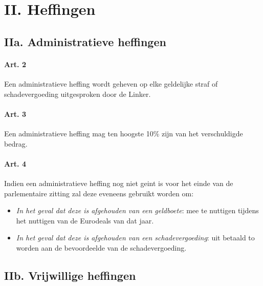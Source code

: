 \hypertarget{ii.-heffingen}{%
\section{II. Heffingen}\label{ii.-heffingen}}

\hypertarget{iia.-administratieve-heffingen}{%
\subsection{IIa. Administratieve
heffingen}\label{iia.-administratieve-heffingen}}

\hypertarget{art.-2}{%
\paragraph{Art. 2}\label{art.-2}}

Een administratieve heffing wordt geheven op elke geldelijke straf of
schadevergoeding uitgesproken door de Linker.

\hypertarget{art.-3}{%
\paragraph{Art. 3}\label{art.-3}}

Een administratieve heffing mag ten hoogste 10\% zijn van het
verschuldigde bedrag.

\hypertarget{art.-4}{%
\paragraph{Art. 4}\label{art.-4}}

Indien een administratieve heffing nog niet geint is voor het einde van
de parlementaire zitting zal deze eveneens gebruikt worden om:

\begin{itemize}
\tightlist
\item
  \emph{In het geval dat deze is afgehouden van een geldboete}: mee te
  nuttigen tijdens het nuttigen van de Eurodeals van dat jaar.
\item
  \emph{In het geval dat deze is afgehouden van een schadevergoeding}:
  uit betaald to worden aan de bevoordeelde van de schadevergoeding.
\end{itemize}

\hypertarget{iib.-vrijwillige-heffingen}{%
\subsection{IIb. Vrijwillige
heffingen}\label{iib.-vrijwillige-heffingen}}

